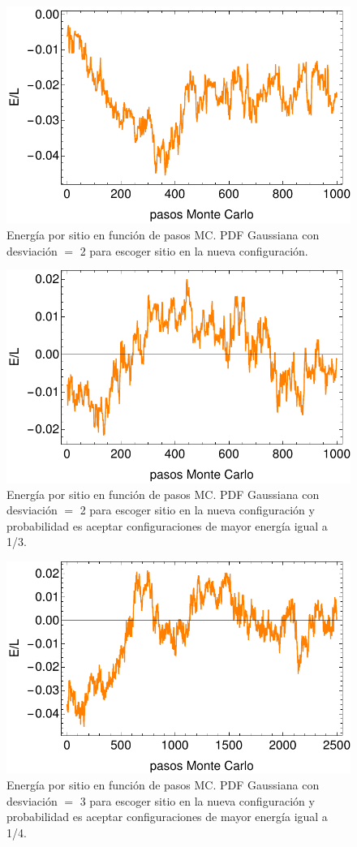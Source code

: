 \documentclass[letterpaper,superscriptaddress,aps,pra,nolongbibliography,twocolumn,showpacs,floatfix,10pt]{revtex4-2} %
\renewcommand{\>}{\rangle}
\newcommand{\<}{\langle}
\begin{document}
\begin{figure}
\centering
\includegraphics[width=0.9\columnwidth]{intento_011}
\caption{Energía por sitio en función de pasos MC. PDF Gaussiana
con desviación $=$ 2 para escoger sitio en la nueva configuración.}
\end{figure}
\begin{figure}
\centering
\includegraphics[width=0.9\columnwidth]{intento_012}
\caption{Energía por sitio en función de pasos MC. PDF Gaussiana
con desviación $=$ 2 para escoger sitio en la nueva configuración
y probabilidad es aceptar configuraciones de mayor energía igual a 1/3.}
\end{figure}
\begin{figure}
\centering
\includegraphics[width=0.9\columnwidth]{intento_013}
\caption{Energía por sitio en función de pasos MC. PDF Gaussiana
con desviación $=$ 3 para escoger sitio en la nueva configuración
y probabilidad es aceptar configuraciones de mayor energía igual a 1/4.}
\end{figure}
\end{document}
